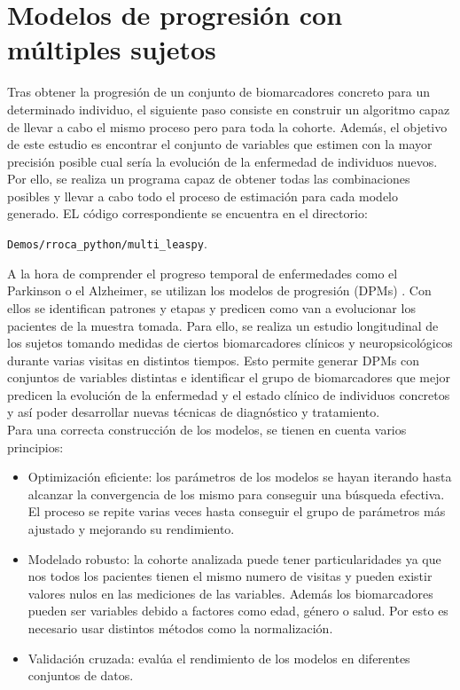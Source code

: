 \section{Modelos de progresión con múltiples sujetos}
Tras obtener la progresión de un conjunto de biomarcadores concreto para un determinado individuo, el siguiente paso consiste en construir un algoritmo capaz de llevar a cabo el mismo proceso pero para toda la cohorte. Además, el objetivo de este estudio es encontrar el conjunto de variables que estimen con la mayor precisión posible cual sería la evolución de la enfermedad de individuos nuevos. Por ello, se realiza un programa capaz de obtener todas las combinaciones posibles y llevar a cabo todo el proceso de estimación para cada modelo generado. EL código correspondiente se encuentra en el directorio:
\begin{center}
	\texttt{Demos/rroca\_python/multi\_leaspy}. 
\end{center} 

A la hora de comprender el progreso temporal de enfermedades como el Parkinson o el Alzheimer, se utilizan los modelos de progresión (DPMs) \cite{ghazi2021robust}. Con ellos se identifican patrones y etapas y predicen como van a evolucionar los pacientes de la muestra tomada. Para ello, se realiza un estudio longitudinal de los sujetos tomando medidas de ciertos biomarcadores clínicos y neuropsicológicos durante varias visitas en distintos tiempos. Esto permite generar DPMs con conjuntos de variables distintas e identificar el grupo de biomarcadores que mejor predicen la evolución de la enfermedad y el estado clínico de individuos concretos y así poder desarrollar nuevas técnicas de diagnóstico y tratamiento.\\

Para una correcta construcción de los modelos, se tienen en cuenta varios principios:
\begin{itemize}
	\item Optimización eficiente: los parámetros de los modelos se hayan iterando hasta alcanzar la convergencia de los mismo para conseguir una búsqueda efectiva. El proceso se repite varias veces hasta conseguir el grupo de parámetros más ajustado y mejorando su rendimiento.
	\item Modelado robusto: la cohorte analizada puede tener particularidades ya que nos todos los pacientes tienen el mismo numero de visitas y pueden existir valores nulos en las mediciones de las variables. Además los biomarcadores pueden ser variables debido a factores como edad, género o salud. Por esto es necesario usar distintos métodos como la normalización.
	\item Validación cruzada: evalúa el rendimiento de los modelos en diferentes conjuntos de datos.
\end{itemize} 

